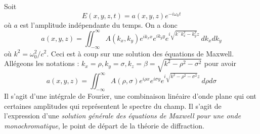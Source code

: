 Soit 
\begin{equation}
E(x,y,z,t) = a(x,y,z)e^{-i\omega_0t}
\end{equation}
où $a$ est l'amplitude indépendante du temps. On a donc
\begin{equation}
a(x,y,z) = \iint_{-\infty}^\infty A(k_x,k_y) e^{ik_xx}e^{ik_yy}e^{i 
\sqrt{k^-k_x^2-k_y^2} z}\ dk_xdk_y
\end{equation}
où $k^2 = \omega_0^2/c^2$. Ceci est à coup sur une solution des équations de Maxwell. Allégeons 
les notations : $k_x=\rho, k_y=\sigma, k_z=\beta=\sqrt{k^2-\rho^2-\sigma^2}$ pour avoir
\begin{equation}
a(x,y,z) = \iint_{-\infty}^\infty A(\rho,\sigma)e^{i\rho x}e^{i\sigma y} e^{i\sqrt{k^2-\rho^2-
\sigma^2}z}\ d\rho d\sigma
\end{equation}
Il s'agit d'une intégrale de Fourier, une combinaison linéaire d'onde plane qui ont certaines 
amplitudes qui représentent le spectre du champ. Il s'agit de l'expression d'une \textit{solution 
générale des équations de Maxwell pour une onde monochromatique}, le point de départ de la 
théorie de diffraction.

















































